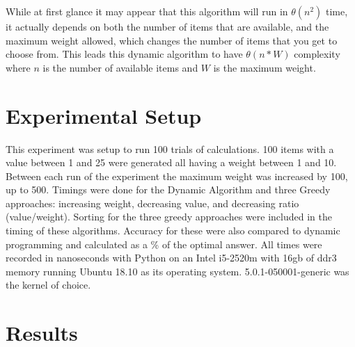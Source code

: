 \documentclass[10pt, letterpaper]{article}
\begin{document}
\medskip
While at first glance it may appear that this algorithm will run in $\theta(n^2)$ time, it actually depends on both the number of items that are available, and the maximum weight allowed, which changes the number of items that you get to choose from. This leads this dynamic algorithm to have $\theta(n * W)$ complexity where $n$ is the number of available items and $W$ is the maximum weight.

\section{Experimental Setup}
This experiment was setup to run 100 trials of calculations. 100 items with a value between 1 and 25 were generated all having a weight between 1 and 10. Between each run of the experiment the maximum weight was increased by 100, up to 500. Timings were done for the Dynamic Algorithm and three Greedy approaches: increasing weight, decreasing value, and decreasing ratio (value/weight). Sorting for the three greedy approaches were included in the timing of these algorithms. Accuracy for these were also compared to dynamic programming and calculated as a \% of the optimal answer. All times were recorded in nanoseconds with Python on an Intel i5-2520m with 16gb of ddr3 memory running Ubuntu 18.10 as its operating system. 5.0.1-050001-generic was the kernel of choice.

\section{Results}
\end{document}
